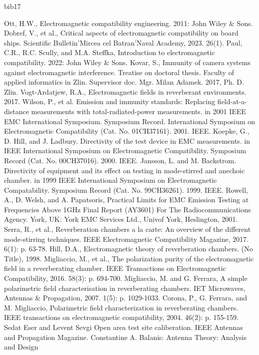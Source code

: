 \begin{thebibliography}{bib17}

	Ott, H.W., Electromagnetic compatibility engineering. 2011: John Wiley \& Sons.
	Dobref, V., et al., Critical aspects of electromagnetic compatibility on board ships. Scientific Bulletin'Mircea cel Batran'Naval Academy, 2023. 26(1).
	Paul, C.R., R.C. Scully, and M.A. Steffka, Introduction to electromagnetic compatibility. 2022: John Wiley \& Sons.
	Kovar, S., Immunity of camera systems against electromagnetic interference. Treatise on doctoral thesis. Faculty of applied informatics in Zlin. Supervisor doc. Mgr. Milan Adamek. 2017, Ph. D. Zlin.
	Vogt-Ardatjew, R.A., Electromagnetic fields in reverberant environments. 2017.
	Wilson, P., et al. Emission and immunity standards: Replacing field-at-a-distance measurements with total-radiated-power measurements. in 2001 IEEE EMC International Symposium. Symposium Record. International Symposium on Electromagnetic Compatibility (Cat. No. 01CH37161). 2001. IEEE.
	Koepke, G., D. Hill, and J. Ladbury. Directivity of the test device in EMC measurements. in IEEE International Symposium on Electromagnetic Compatibility. Symposium Record (Cat. No. 00CH37016). 2000. IEEE.
	Jansson, L. and M. Backstrom. Directivity of equipment and its effect on testing in mode-stirred and anechoic chamber. in 1999 IEEE International Symposium on Electromagnetic Compatability. Symposium Record (Cat. No. 99CH36261). 1999. IEEE.
	Rowell, A., D. Welsh, and A. Papatsoris, Practical Limits for EMC Emission Testing at Frequencies Above 1GHz Final Report (AY3601) For The Radiocommunications Agency. York, UK: York EMC Services Ltd., Univof York, Heslington, 2001.
	Serra, R., et al., Reverberation chambers a la carte: An overview of the different mode-stirring techniques. IEEE Electromagnetic Compatibility Magazine, 2017. 6(1): p. 63-78.
	Hill, D.A., Electromagnetic theory of reverberation chambers. (No Title), 1998.
	Migliaccio, M., et al., The polarization purity of the electromagnetic field in a reverberating chamber. IEEE Transactions on Electromagnetic Compatibility, 2016. 58(3): p. 694-700.
	Migliaccio, M. and G. Ferrara, A simple polarimetric field characterisation in reverberating chambers. IET Microwaves, Antennas \& Propagation, 2007. 1(5): p. 1029-1033.
	Corona, P., G. Ferrara, and M. Migliaccio, Polarimetric field characterization in reverberating      chambers. IEEE transactions on electromagnetic compatibility, 2004. 46(2): p. 155-159.
  Sedat Eser and Levent Sevgi Open area test site caliberation. IEEE Antennas and Propagation Magazine. 
 Constantine A. Balanis: Antenna Theory: Analysis and Design

\end{thebibliography}

